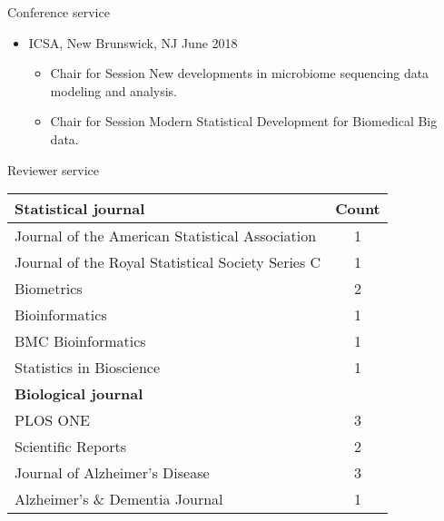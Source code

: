 \documentclass{resume} %
\begin{document}

\begin{rSection}{Conference service}

\begin{itemize}[noitemsep,topsep=0pt]

\item  ICSA, New Brunswick, NJ  \hfill {June 2018}
\begin{itemize}[noitemsep,topsep=0pt]
\item{Chair for Session New developments in microbiome sequencing data modeling and analysis.}
\item{Chair for Session Modern Statistical Development for Biomedical Big data.}
\end{itemize}


\end{itemize}

\end{rSection}


\begin{rSection}{Reviewer service}

\begin{table}[htp]
\begin{center}
\begin{tabular}{l c }
\hline
\hline
\bf{Statistical journal} & Count \\
\hline
Journal of the American Statistical Association & 1 \\
Journal of the Royal Statistical Society Series C & 1 \\
Biometrics & 2 \\
Bioinformatics & 1 \\
BMC Bioinformatics & 1 \\
Statistics in Bioscience & 1 \\
\hline
\hline
\bf{Biological journal} &  \\
\hline
PLOS ONE & 3 \\
Scientific Reports & 2 \\
Journal of Alzheimer's Disease & 3 \\
Alzheimer's \& Dementia Journal & 1 \\
\hline
\hline
\end{tabular}
\end{center}
\label{default}
\end{table}%


\end{rSection}
\end{document}
